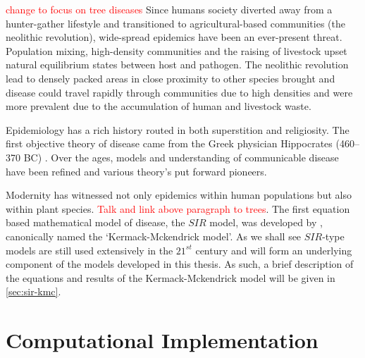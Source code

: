 
\textcolor{red}{change to focus on tree diseases}
Since humans society diverted away from a hunter-gather lifestyle and transitioned to agricultural-based communities (the neolithic revolution), wide-spread epidemics have been an ever-present threat. Population mixing, high-density communities and the raising of livestock upset natural equilibrium states between host and pathogen. The neolithic revolution lead to densely packed areas in close proximity to other species brought and disease could travel rapidly through communities due to high densities and were more prevalent due to the accumulation of human and livestock waste.

Epidemiology has a rich history routed in both superstition and religiosity. The first objective theory of disease came from the Greek physician Hippocrates (460\---370 BC) \citep{garrison1922introduction}. Over the ages, models and understanding of communicable disease have been refined and various theory's put forward pioneers.

Modernity has witnessed not only epidemics within human populations but also within plant species. \textcolor{red}{Talk and link above paragraph to trees}. 
The first equation based mathematical model of disease, the $SIR$ model, was developed by \cite{kermack-model}, canonically named the `Kermack-Mckendrick model'. As we shall see $SIR$-type models are still used extensively in the $21^{st}$ century and will form an underlying component of the models developed in this thesis. As such, a brief description of the equations and results of the Kermack-Mckendrick model will be given in \ref{sec:sir-kmc}.

\section{Computational Implementation}

